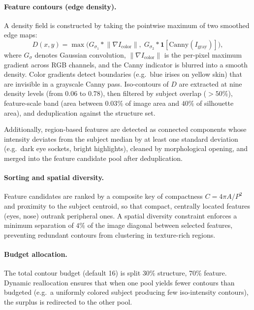 \documentclass[12pt,a4paper]{report}
\theoremstyle{thms}
\theoremstyle{defns}
\begin{document}
\paragraph{Feature contours (edge density).} A density field is constructed by taking the pointwise maximum of two smoothed edge maps:
\begin{equation}
    D(x,y) = \max\!\bigl(G_{\sigma_1} * \lVert\nabla I_{\mathrm{color}}\rVert,\; G_{\sigma_2} * \mathbf{1}[\text{Canny}(I_{\mathrm{gray}})]\bigr),
\end{equation}
where $G_{\sigma}$ denotes Gaussian convolution, $\lVert\nabla I_{\mathrm{color}}\rVert$ is the per-pixel maximum gradient across RGB channels, and the Canny indicator is blurred into a smooth density. Color gradients detect boundaries (e.g.\ blue irises on yellow skin) that are invisible in a grayscale Canny pass. Iso-contours of $D$ are extracted at nine density levels (from $0.06$ to $0.78$), then filtered by subject overlap ($> 50\%$), feature-scale band (area between $0.03\%$ of image area and $40\%$ of silhouette area), and deduplication against the structure set.

Additionally, region-based features are detected as connected components whose intensity deviates from the subject median by at least one standard deviation (e.g.\ dark eye sockets, bright highlights), cleaned by morphological opening, and merged into the feature candidate pool after deduplication.

\paragraph{Sorting and spatial diversity.} Feature candidates are ranked by a composite key of compactness $C = 4\pi A / P^{2}$ and proximity to the subject centroid, so that compact, centrally located features (eyes, nose) outrank peripheral ones. A spatial diversity constraint enforces a minimum separation of $4\%$ of the image diagonal between selected features, preventing redundant contours from clustering in texture-rich regions.

\paragraph{Budget allocation.} The total contour budget (default 16) is split 30\% structure, 70\% feature. Dynamic reallocation ensures that when one pool yields fewer contours than budgeted (e.g.\ a uniformly colored subject producing few iso-intensity contours), the surplus is redirected to the other pool.
\end{document}
